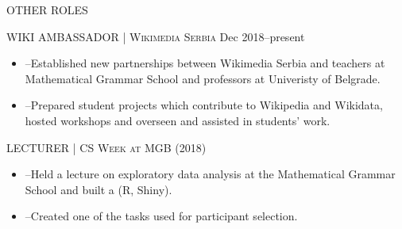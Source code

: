 \begin{minipage}[t]{\linewidth}\vspace{\sectionTopmargin}
{\titleFont\light OTHER ROLES}\newline

\begin{minipage}[t]{\linewidth}\vspace{-4mm}
{\subtitleFont\bold WIKI AMBASSADOR \extraLight\scshape | Wikimedia Serbia}\newline
{\vfill\vspace{\dateTopMargin}\dateFont\extraLight Dec 2018--present\alignRight}\linebreak\newline

\vspace{-7mm}
{\contentFont \begin{itemize}
    \item --Established new partnerships between Wikimedia Serbia and teachers at Mathematical Grammar School and professors at Univeristy of Belgrade.
    \item --Prepared student projects which contribute to Wikipedia and Wikidata, hosted workshops and overseen and assisted in students' work.
\end{itemize}}
\end{minipage}\newline%

\vspace{\subsectionSpace}
{\subtitleFont\bold LECTURER \extraLight\scshape | CS Week at MGB \dateFont\extraLight(2018)}\newline
\newline

\vspace{-7mm}
{\contentFont \begin{itemize}
    \item --Held a lecture on exploratory data analysis at the   {Mathematical Grammar School} and built a  (R, Shiny).
    \item --Created one of the tasks used for participant selection.
\end{itemize}}
\end{minipage}
\newline%